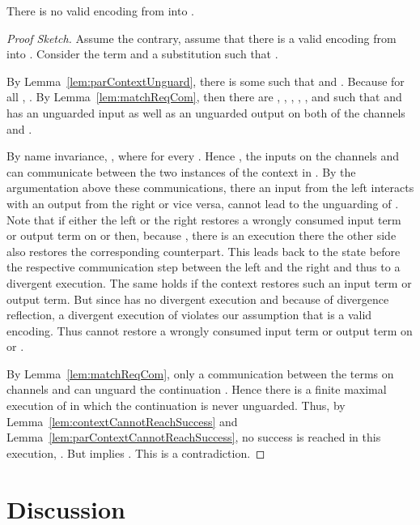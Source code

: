 \documentclass[final,copyright,creativecommons]{eptcs}
\begin{document}
\begin{theorem}
	\label{thm:noEnc}
	There is no valid encoding from \piT into \piNM.
\end{theorem}

\begin{proof}[Proof Sketch]
	Assume the contrary, \ie assume that there is a valid encoding \encod from \piT into \piNM.
	Consider the term  and a substitution  such that .
	
	By Lemma~\ref{lem:parContextUnguard}, there is some  such that  and .
	Because  for all , .
	By Lemma~\ref{lem:matchReqCom}, then there are , , , , , and  such that  and  has an unguarded input as well as an unguarded output on both of the channels  and .
	
	By name invariance, , where \linebreak  for every .
	Hence , \ie the inputs on the channels  and  can communicate between the two instances of the context  in .
	By the argumentation above these communications, \ie there an input from the left  interacts with an output from the right  or vice versa, cannot lead to the unguarding of .
	Note that if either the left  or the right  restores a wrongly consumed input term or output term on  or  then, because , there is an execution there the other side also restores the corresponding counterpart. This leads back to the state before the respective communication step between the left  and the right  and thus to a divergent execution.
	The same holds if the context  restores such an input term or output term.
	But since  has no divergent execution and because of divergence reflection, a divergent execution of  violates our assumption that \encod is a valid encoding.
	Thus  cannot restore a wrongly consumed input term or output term on  or .
	
	By Lemma~\ref{lem:matchReqCom}, only a communication between the terms on channels  and  can unguard the continuation . Hence there is a finite maximal execution of  in which the continuation  is never unguarded.
	Thus, by Lemma~\ref{lem:contextCannotReachSuccess} and Lemma~\ref{lem:parContextCannotReachSuccess}, no success is reached in this execution, \ie .
	But  implies .
	This is a contradiction.
\end{proof}



\section{Discussion}
\label{sec:discussion}
\end{document}
